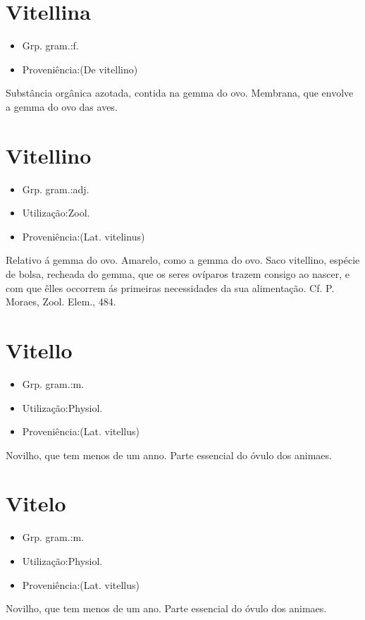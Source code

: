 \documentclass{article}
\begin{document}
\section{Vitellina}
\begin{itemize}
\item {Grp. gram.:f.}
\end{itemize}
\begin{itemize}
\item {Proveniência:(De \textunderscore vitellino\textunderscore )}
\end{itemize}
Substância orgânica azotada, contida na gemma do ovo.
Membrana, que envolve a gemma do ovo das aves.
\section{Vitellino}
\begin{itemize}
\item {Grp. gram.:adj.}
\end{itemize}
\begin{itemize}
\item {Utilização:Zool.}
\end{itemize}
\begin{itemize}
\item {Proveniência:(Lat. \textunderscore vitelinus\textunderscore )}
\end{itemize}
Relativo á gemma do ovo.
Amarelo, como a gemma do ovo.
\textunderscore Saco vitellino\textunderscore , espécie de bolsa, recheada do gemma, que os seres ovíparos trazem consigo ao nascer, e com que êlles occorrem ás primeiras necessidades da sua alimentação. Cf. P. Moraes, \textunderscore Zool. Elem.\textunderscore , 484.
\section{Vitello}
\begin{itemize}
\item {Grp. gram.:m.}
\end{itemize}
\begin{itemize}
\item {Utilização:Physiol.}
\end{itemize}
\begin{itemize}
\item {Proveniência:(Lat. \textunderscore vitellus\textunderscore )}
\end{itemize}
Novilho, que tem menos de um anno.
Parte essencial do óvulo dos animaes.
\section{Vitelo}
\begin{itemize}
\item {Grp. gram.:m.}
\end{itemize}
\begin{itemize}
\item {Utilização:Physiol.}
\end{itemize}
\begin{itemize}
\item {Proveniência:(Lat. \textunderscore vitellus\textunderscore )}
\end{itemize}
Novilho, que tem menos de um ano.
Parte essencial do óvulo dos animaes.
\end{document}
